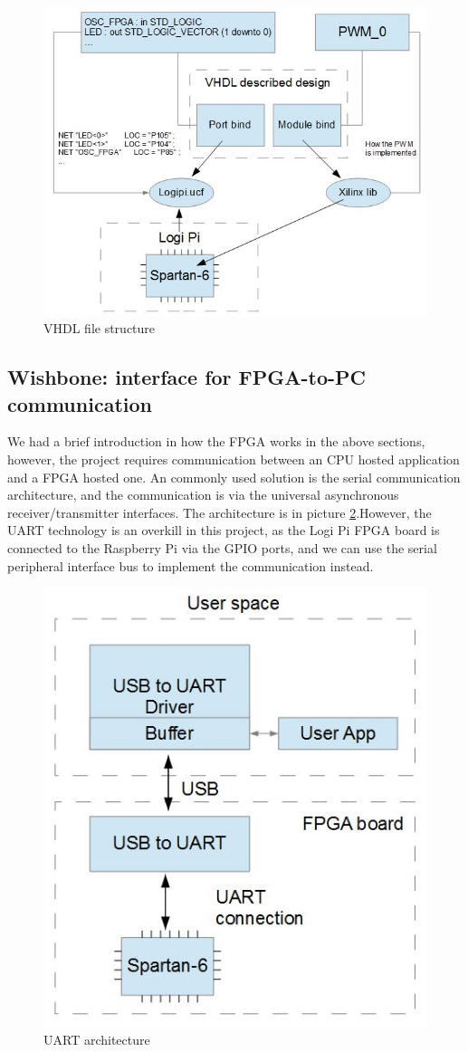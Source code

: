 \documentclass[11pt,openright,a4paper]{report}
\begin{document}
\begin{figure}[H]
\centering
\includegraphics[width=0.7\linewidth]{picture/vhdlstruct}
\caption{VHDL file structure}
\label{fig:vhdlstruct}
\end{figure}
\subsection{Wishbone: interface for FPGA-to-PC communication}
We had a brief introduction in how the FPGA works in the above sections, however, the project requires communication between an CPU hosted application and a FPGA hosted one. An commonly used solution is the serial communication architecture, and the communication is via the universal asynchronous receiver/transmitter interfaces\cite{michael1992universal}. The architecture is in picture \ref{fig:uart}.However, the UART technology is an overkill in this project, as the Logi Pi FPGA board is connected to the Raspberry Pi via the GPIO ports, and we can use the serial peripheral interface bus to implement the communication instead.\\
\begin{figure}[H]
	\centering
	\includegraphics[width=0.4\linewidth]{picture/uart}
	\caption{UART architecture}
	\label{fig:uart}
\end{figure}
\end{document}
